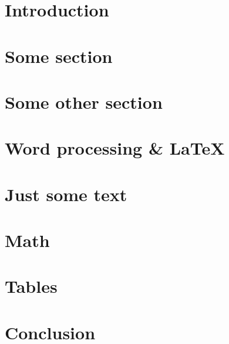 %
%


\begin{abstract}

\end{abstract}


\section{Introduction}
\label{sec:introduction}



\section{Some section}
\label{sec:relwork}


\section{Some other section}
\label{sec:model}


\section{Word processing \& \LaTeX}
\label{sec:latex}


\section{Just some text}
\label{sec:just-some-text}

\section{Math}
\label{sec:math}


\section{Tables}
\label{sec:tables}


\section{Conclusion}
\label{sec:concl}
